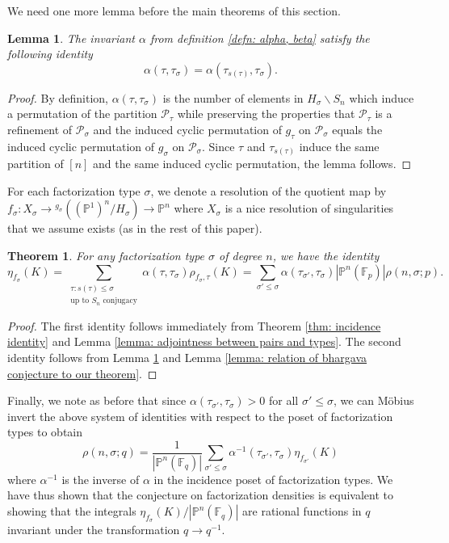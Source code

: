 \documentclass[10pt]{article}
\theoremstyle{plain}
\newtheorem{lemma}[theorem]{Lemma}
\newtheorem{thm}[theorem]{Theorem}
\theoremstyle{definition}
\numberwithin{equation}{section}
\begin{document}
We need one more lemma before the main theorems of this section.

\begin{lemma}\label{lemma: alpha invariant under adjointness}
The invariant $\alpha$ from definition \ref{defn: alpha, beta} satisfy the following identity
\[\alpha(\tau,\tau_\sigma) = \alpha(\tau_{s(\tau)},\tau_\sigma).\]
\end{lemma}
\begin{proof}
By definition, $\alpha(\tau,\tau_\sigma)$ is the number of elements in $H_\sigma\backslash S_n$ which induce a permutation of the partition $\mathcal P_\tau$ while preserving the properties that $\mathcal P_\tau$ is a refinement of $\mathcal P_\sigma$ and the induced cyclic permutation of $g_\tau$ on $\mathcal P_\sigma$ equals the induced cyclic permutation of $g_\sigma$ on $\mathcal P_\sigma$. Since $\tau$ and $\tau_{s(\tau)}$ induce the same partition of $[n]$ and the same induced cyclic permutation, the lemma follows.
\end{proof}

For each factorization type $\sigma$, we denote a resolution of the quotient map by $f_\sigma: X_\sigma \to {^{g_\sigma}}\left((\mathbb P^1)^n/H_{\sigma}\right) \to \mathbb P^n$ where $X_\sigma$ is a nice resolution of singularities that we assume exists (as in the rest of this paper).

\begin{thm}
For any factorization type $\sigma$ of degree $n$, we have the identity
\[\eta_{f_\sigma}(K) = \sum_{\substack{\tau : s(\tau) \leq \sigma\\\text{up to } S_n \text{ conjugacy}}}\alpha(\tau,\tau_\sigma)\rho_{f_\sigma,\tau}(K) = \sum_{\sigma'\leq \sigma}\alpha(\tau_{\sigma'},\tau_{\sigma})|\mathbb P^n(\mathbb F_p)|\rho(n,\sigma;p).\]
\end{thm}
\begin{proof}
The first identity follows immediately from Theorem \ref{thm: incidence identity} and Lemma \ref{lemma: adjointness between pairs and types}. The second identity follows from Lemma \ref{lemma: alpha invariant under adjointness} and Lemma \ref{lemma: relation of bhargava conjecture to our theorem}.
\end{proof}

Finally, we note as before that since $\alpha(\tau_{\sigma'},\tau_{\sigma}) > 0$ for all $\sigma' \leq \sigma$, we can M\"obius invert the above system of identities with respect to the poset of factorization types to obtain
\begin{equation}\label{eqn: factorization densities as integrals}
    \rho(n,\sigma;q) = \frac{1}{|\mathbb P^n(\mathbb F_q)|}\sum_{\sigma'\leq \sigma}\alpha^{-1}(\tau_{\sigma'},\tau_{\sigma})\eta_{f_{\sigma'}}(K)
\end{equation}
where $\alpha^{-1}$ is the inverse of $\alpha$ in the incidence poset of factorization types. We have thus shown that the conjecture on factorization densities is equivalent to showing that the integrals $\eta_{f_\sigma}(K)/|\mathbb P^n(\mathbb F_q)|$ are rational functions in $q$ invariant under the transformation $q \to q^{-1}$. 
\end{document}
